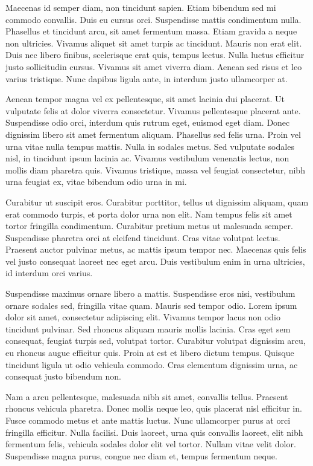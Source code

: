 \documentclass[12pt, a4paper]{article}
\begin{document}
Maecenas id semper diam, non tincidunt sapien. Etiam bibendum sed mi commodo convallis. Duis eu cursus orci. Suspendisse mattis condimentum nulla. Phasellus et tincidunt arcu, sit amet fermentum massa. Etiam gravida a neque non ultricies. Vivamus aliquet sit amet turpis ac tincidunt. Mauris non erat elit. Duis nec libero finibus, scelerisque erat quis, tempus lectus. Nulla luctus efficitur justo sollicitudin cursus. Vivamus sit amet viverra diam. Aenean sed risus et leo varius tristique. Nunc dapibus ligula ante, in interdum justo ullamcorper at.

Aenean tempor magna vel ex pellentesque, sit amet lacinia dui placerat. Ut vulputate felis at dolor viverra consectetur. Vivamus pellentesque placerat ante. Suspendisse odio orci, interdum quis rutrum eget, euismod eget diam. Donec dignissim libero sit amet fermentum aliquam. Phasellus sed felis urna. Proin vel urna vitae nulla tempus mattis. Nulla in sodales metus. Sed vulputate sodales nisl, in tincidunt ipsum lacinia ac. Vivamus vestibulum venenatis lectus, non mollis diam pharetra quis. Vivamus tristique, massa vel feugiat consectetur, nibh urna feugiat ex, vitae bibendum odio urna in mi.

Curabitur ut suscipit eros. Curabitur porttitor, tellus ut dignissim aliquam, quam erat commodo turpis, et porta dolor urna non elit. Nam tempus felis sit amet tortor fringilla condimentum. Curabitur pretium metus ut malesuada semper. Suspendisse pharetra orci at eleifend tincidunt. Cras vitae volutpat lectus. Praesent auctor pulvinar metus, ac mattis ipsum tempor nec. Maecenas quis felis vel justo consequat laoreet nec eget arcu. Duis vestibulum enim in urna ultricies, id interdum orci varius.

Suspendisse maximus ornare libero a mattis. Suspendisse eros nisi, vestibulum ornare sodales sed, fringilla vitae quam. Mauris sed tempor odio. Lorem ipsum dolor sit amet, consectetur adipiscing elit. Vivamus tempor lacus non odio tincidunt pulvinar. Sed rhoncus aliquam mauris mollis lacinia. Cras eget sem consequat, feugiat turpis sed, volutpat tortor. Curabitur volutpat dignissim arcu, eu rhoncus augue efficitur quis. Proin at est et libero dictum tempus. Quisque tincidunt ligula ut odio vehicula commodo. Cras elementum dignissim urna, ac consequat justo bibendum non.

Nam a arcu pellentesque, malesuada nibh sit amet, convallis tellus. Praesent rhoncus vehicula pharetra. Donec mollis neque leo, quis placerat nisl efficitur in. Fusce commodo metus et ante mattis luctus. Nunc ullamcorper purus at orci fringilla efficitur. Nulla facilisi. Duis laoreet, urna quis convallis laoreet, elit nibh fermentum felis, vehicula sodales dolor elit vel tortor. Nullam vitae velit dolor. Suspendisse magna purus, congue nec diam et, tempus fermentum neque.
\end{document}

